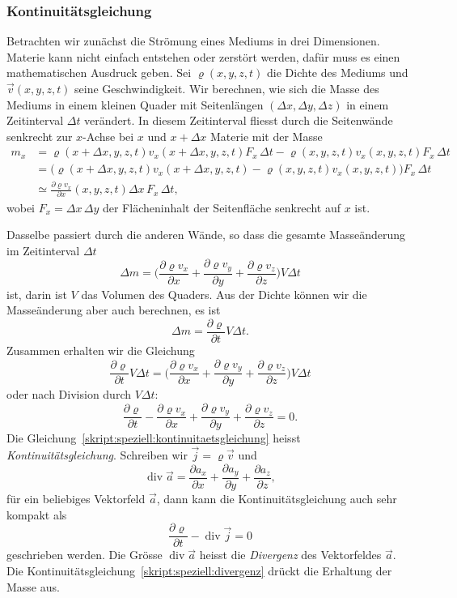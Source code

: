 \subsubsection{Kontinuitätsgleichung}
Betrachten wir zunächst die Strömung eines Mediums in drei Dimensionen.
Materie kann nicht einfach entstehen oder zerstört werden, dafür muss
es einen mathematischen Ausdruck geben.
Sei $\varrho(x,y,z,t)$ die Dichte des Mediums und $\vec v(x,y,z,t)$ 
seine Geschwindigkeit.
Wir berechnen, wie sich die Masse des Mediums in einem kleinen
Quader mit Seitenlängen $(\Delta x, \Delta y, \Delta z)$ in einem
Zeitinterval $\Delta t$ verändert.
In diesem Zeitinterval fliesst durch die Seitenwände senkrecht zur
$x$-Achse bei $x$ und $x+\Delta x$ 
Materie mit der Masse
\begin{align*}
m_x
&=
\varrho(x+\Delta x,y,z,t) v_x(x+\Delta x,y,z,t) F_x\,\Delta t
-\varrho(x,y,z,t) v_x(x,y,z,t) F_x\,\Delta t
\\
&=
\bigl(\varrho(x+\Delta x,y,z,t)
v_x(x+\Delta x,y,z,t) -\varrho(x,y,z,t) v_x(x,y,z,t)\bigr) F_x\,\Delta t
\\
&\simeq
\frac{\partial \varrho v_x}{\partial x}(x,y,z,t)\Delta x\, F_x\,\Delta t,
\end{align*}
wobei $F_x=\Delta x\,\Delta y$ der Flächeninhalt der Seitenfläche senkrecht
auf $x$ ist.

Dasselbe passiert durch die anderen Wände, so dass
die gesamte Masseänderung im Zeitinterval $\Delta t$
\[
\Delta m
=
\biggl(
\frac{\partial\varrho v_x}{\partial x}
+
\frac{\partial\varrho v_y}{\partial y}
+
\frac{\partial\varrho v_z}{\partial z}
\biggr)V\Delta t
\]
ist, darin ist $V$ das Volumen des Quaders.
Aus der Dichte können wir die Masseänderung aber auch berechnen,
es ist
\[
\Delta m
=
\frac{\partial\varrho}{\partial t}V \Delta t.
\]
Zusammen erhalten wir die Gleichung
\[
\frac{\partial\varrho}{\partial t}V \Delta t
=
\biggl(
\frac{\partial \varrho v_x}{\partial x}
+
\frac{\partial \varrho v_y}{\partial y}
+
\frac{\partial \varrho v_z}{\partial z}
\biggr)V\Delta t
\]
oder nach Division durch $V\Delta t$:
\begin{equation}
\frac{\partial\varrho}{\partial t}
-
\frac{\partial \varrho v_x}{\partial x}
+
\frac{\partial \varrho v_y}{\partial y}
+
\frac{\partial \varrho v_z}{\partial z}
=0.
\label{skript:speziell:kontinuitaetsgleichung}
\end{equation}
Die Gleichung~\eqref{skript:speziell:kontinuitaetsgleichung} heisst
{\em Kontinuitätsgleichung}.
Schreiben wir $\vec j = \varrho\vec v$ und
\begin{equation}
\operatorname{div}\vec a
=
\frac{\partial a_x}{\partial x}
+
\frac{\partial a_y}{\partial y}
+
\frac{\partial a_z}{\partial z},
\label{skript:speziell:divergenz}
\end{equation}
für ein beliebiges Vektorfeld $\vec a$,
dann kann die Kontinuitätsgleichung auch sehr kompakt als
\[
\frac{\partial\varrho}{\partial t}-\operatorname{div}\vec j=0
\]
geschrieben werden.
Die Grösse $\operatorname{div}\vec a$ heisst die {\em Divergenz}
des Vektorfeldes $\vec a$.
Die Kontinuitätsgleichung~\eqref{skript:speziell:divergenz} drückt
die Erhaltung der Masse aus.

